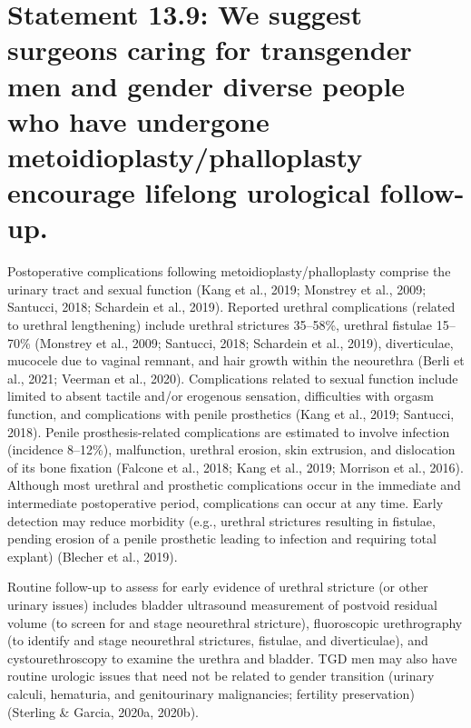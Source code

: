 \documentclass[
]{book}
\begin{document}
\hypertarget{statement-13.9-we-suggest-surgeons-caring-for-transgender-men-and-gender-diverse-people-who-have-undergone-metoidioplastyphalloplasty-encourage-lifelong-urological-follow-up.}{%
\section*{Statement 13.9: We suggest surgeons caring for transgender men and gender diverse people who have undergone metoidioplasty/phalloplasty encourage lifelong urological follow-up.}\label{statement-13.9-we-suggest-surgeons-caring-for-transgender-men-and-gender-diverse-people-who-have-undergone-metoidioplastyphalloplasty-encourage-lifelong-urological-follow-up.}}

Postoperative complications following metoidioplasty/phalloplasty comprise the urinary tract
and sexual function (Kang et al., 2019; Monstrey
et al., 2009; Santucci, 2018; Schardein et al.,
2019). Reported urethral complications (related
to urethral lengthening) include urethral strictures 35--58\%, urethral fistulae 15--70\% (Monstrey
et al., 2009; Santucci, 2018; Schardein et al.,
2019), diverticulae, mucocele due to vaginal
remnant, and hair growth within the neourethra
(Berli et al., 2021; Veerman et al., 2020).
Complications related to sexual function include
limited to absent tactile and/or erogenous sensation, difficulties with orgasm function, and
complications with penile prosthetics (Kang
et al., 2019; Santucci, 2018). Penile
prosthesis-related complications are estimated to
involve infection (incidence 8--12\%),
malfunction, urethral erosion, skin extrusion,
and dislocation of its bone fixation (Falcone
et al., 2018; Kang et al., 2019; Morrison et al.,
2016). Although most urethral and prosthetic
complications occur in the immediate and intermediate postoperative period, complications can
occur at any time. Early detection may reduce
morbidity (e.g., urethral strictures resulting in
fistulae, pending erosion of a penile prosthetic
leading to infection and requiring total explant)
(Blecher et al., 2019).

Routine follow-up to assess for early evidence
of urethral stricture (or other urinary issues)
includes bladder ultrasound measurement of postvoid residual volume (to screen for and stage neourethral stricture), fluoroscopic urethrography (to
identify and stage neourethral strictures, fistulae,
and diverticulae), and cystourethroscopy to examine the urethra and bladder. TGD men may also
have routine urologic issues that need not be
related to gender transition (urinary calculi, hematuria, and genitourinary malignancies; fertility
preservation) (Sterling \& Garcia, 2020a, 2020b).
\end{document}
